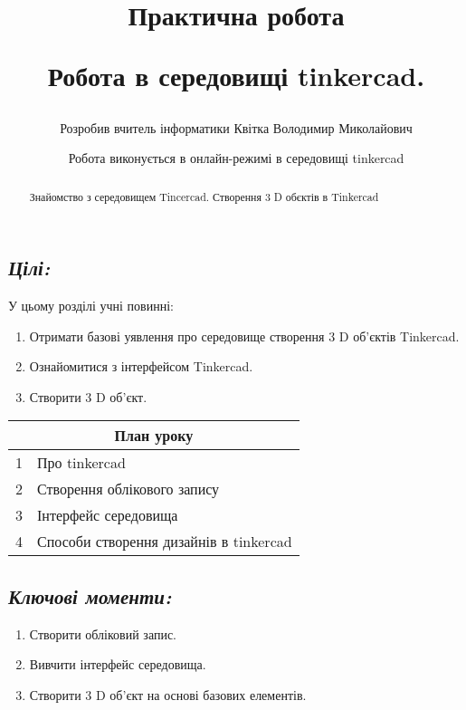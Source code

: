 \documentclass[12pt, a4paper]{article}
\title{Практична робота 
	
	Робота в середовищі tinkercad.}
\author{Розробив вчитель інформатики Квітка Володимир Миколайович}
\date{Робота виконується в онлайн-режимі в середовищі tinkercad }
\begin{document}
	
	\maketitle
	\begin{abstract}
		Знайомство з середовищем Tincercad. Створення 3 D обєктів в Tinkercad
	\end{abstract}
	\subsection*{\textit{Цілі:}}
	
	У цьому розділі учні повинні:
	\begin{enumerate}
		\item Отримати базові уявлення про середовище створення 3 D об'єктів Tinkercad.
		\item Ознайомитися з інтерфейсом Tinkercad.
		\item Створити 3 D об'єкт.
	\end{enumerate}
	\begin{center}
		\begin{tabular}{|p{} | p{}|}
			\hline 
			\multicolumn{2}{|c|}{План уроку}\\
			\hline
			1 & Про tinkercad  \\ 
			\hline
			2 & Створення облікового запису \\ 
			\hline
			3 & Інтерфейс середовища  \\ 
			\hline
			4 & Способи створення дизайнів в tinkercad\\ 
			\hline
		\end{tabular}
	\end{center}
	
	
	
	
	\subsection*{\textit{Ключові моменти:}}
	\begin{enumerate}
		\item Створити обліковий запис.
		\item Вивчити інтерфейс середовища.
		\item Створити 3 D об'єкт на основі базових елементів.
	\end{enumerate}
	
	
	
\end{document}
